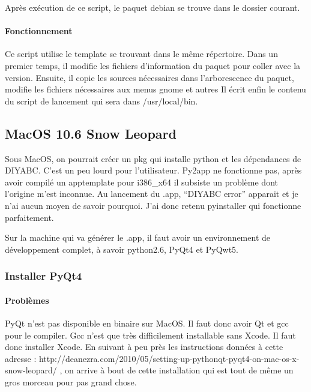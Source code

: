 \documentclass[12pt,a4paper]{article}
\begin{document}
        Après exécution de ce script, le paquet debian se trouve dans le dossier courant.

        \paragraph{Fonctionnement}
        Ce script utilise le template se trouvant dans le même
        répertoire. Dans un premier temps, il modifie les fichiers d'information du paquet pour coller avec la version. Ensuite, il 
        copie les sources nécessaires dans l'arborescence du paquet, modifie les fichiers nécessaires aux menus gnome et autres
        Il écrit enfin le contenu du script de lancement qui sera dans
        /usr/local/bin.

    \subsection{MacOS 10.6 Snow Leopard}
        Sous MacOS, on pourrait cr\'eer un pkg qui installe python et les d\'ependances de DIYABC. C'est un peu lourd
        pour l'utilisateur. Py2app ne fonctionne pas, après avoir compil\'e un apptemplate pour i386\_x64
        il subsiste un problème dont l'origine m'est inconnue. Au lancement
        du .app, ``DIYABC error'' apparait et je n'ai aucun moyen de savoir pourquoi. J'ai donc retenu pyinstaller qui fonctionne parfaitement.

        Sur la machine qui va g\'en\'erer le .app, il faut avoir un environnement de d\'eveloppement complet, à savoir
        python2.6, PyQt4 et PyQwt5.

        \subsubsection{Installer PyQt4}

        \paragraph{Problèmes}

        PyQt n'est pas disponible en binaire sur MacOS. Il faut donc avoir Qt et gcc pour le compiler. 
        Gcc n'est que très difficilement installable sans Xcode. Il faut donc installer Xcode.
        En suivant à peu près les instructions données à cette adresse : \newline
        http://deanezra.com/2010/05/setting-up-pythonqt-pyqt4-on-mac-os-x-snow-leopard/\newline
        , on arrive à bout de cette installation qui est tout de même un gros morceau pour pas grand chose.
    
\end{document}
